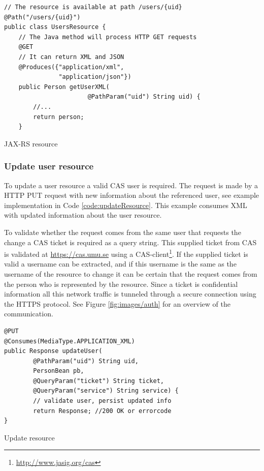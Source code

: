 \documentclass[titlepage, twocolumn, a4paper, 10pt]{article}
\begin{document}
\begin{code}
  \begin{footnotesize}
\begin{verbatim}
// The resource is available at path /users/{uid}
@Path("/users/{uid}")
public class UsersResource {
    // The Java method will process HTTP GET requests
    @GET
    // It can return XML and JSON
    @Produces({"application/xml",
               "application/json"})
    public Person getUserXML(
                       @PathParam("uid") String uid) {
        //...
        return person;
    }
\end{verbatim}
  \end{footnotesize}
  \caption{JAX-RS resource}\label{code:jaxrs}
\end{code}

\subsubsection{Update user resource}\label{sec:updateuser}
To update a user resource a valid CAS user is required. The request is made by a HTTP PUT request with new information about the referenced user, see example implementation in Code \ref{code:updateResource}. This example consumes XML with updated information about the user resource.

To validate whether the request comes from the same user that requests the change a CAS ticket is required as a query string. This supplied ticket from CAS is validated at \url{https://cas.umu.se} using a CAS-client\footnote{\url{http://www.jasig.org/cas}}. If the supplied ticket is valid a username can be extracted, and if this username is the same as the username of the resource to change it can be certain that the request comes from the person who is represented by the resource. Since a ticket is confidential information all this network traffic is tunneled through a secure connection using the HTTPS protocol. See Figure \ref{fig:images/auth} for an overview of the communication.

\begin{code}
  \begin{footnotesize}
\begin{verbatim}
@PUT
@Consumes(MediaType.APPLICATION_XML)
public Response updateUser(
        @PathParam("uid") String uid,
        PersonBean pb,
        @QueryParam("ticket") String ticket,
        @QueryParam("service") String service) {
        // validate user, persist updated info
        return Response; //200 OK or errorcode
}
\end{verbatim}
  \end{footnotesize}
  \caption{Update resource}\label{code:updateResource}
\end{code}
\end{document}
